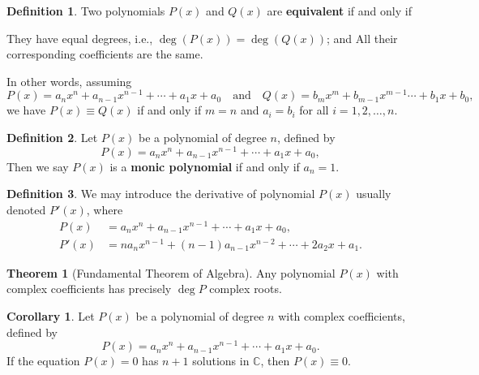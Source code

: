\documentclass[12pt,a4paper]{memoir}
\theoremstyle{definition}
\newtheorem*{definition}{Definition}
\newtheorem{theorem}{Theorem}
\newtheorem{corollary}{Corollary}
\begin{document}
	
	\begin{tcolorbox}[title={Equivalent Polynomials, Monic Polynomials}]
		\begin{definition}
			Two polynomials $P(x)$ and $Q(x)$ are \textbf{equivalent} if and only if 
			\begin{tasks}
				\task They have equal degrees, i.e., $\deg(P(x))=\deg(Q(x))$; and
				\task All their corresponding coefficients are the same.
			\end{tasks}
			In other words, assuming
			\[P(x)=a_nx^n+a_{n-1}x^{n-1}+\cdots+a_1x+a_0 \quad \text{and} \quad Q(x)=b_mx^m+b_{m-1}x^{m-1}\cdots+b_1x+b_0,\]
			we have $P(x) \equiv Q(x)$ if and only if $m=n$ and $a_i=b_i$ for all $i=1,2,\dots,n$.
		\end{definition}
		
		\begin{definition}
			Let $P(x)$ be a polynomial of degree $n$, defined by
			\[P(x)=a_nx^n+a_{n-1}x^{n-1}+\cdots+a_1x+a_0,\]
			Then we say $P(x)$ is a \textbf{monic polynomial} if and only if $a_n=1$.
		\end{definition}
		
		\begin{definition}
			We may introduce the derivative of polynomial $P(x)$ usually denoted $P'(x)$, where
			\begin{align*}
				P(x) &= a_nx^n+a_{n-1}x^{n-1}+\cdots+a_1x+a_0,\\
				P'(x) &= na_nx^{n-1} + (n-1)a_{n-1}x^{n-2}+\cdots + 2a_2x+a_1.
			\end{align*}
		\end{definition}
	\end{tcolorbox}
	
	\begin{theorem}[Fundamental Theorem of Algebra]
		Any polynomial $P(x)$ with complex coefficients has precisely $\deg P$ complex roots.
	\end{theorem}
	
	
	\begin{corollary}
		Let $P(x)$ be a polynomial of degree $n$ with complex coefficients, defined by
		\[P(x)=a_nx^n+a_{n-1}x^{n-1}+\cdots+a_1x+a_0.\]
		If the equation $P(x)=0$ has $n+1$ solutions in $\mathbb C$, then $P(x)\equiv 0$.
	\end{corollary}
	
	
	
	
\end{document}
